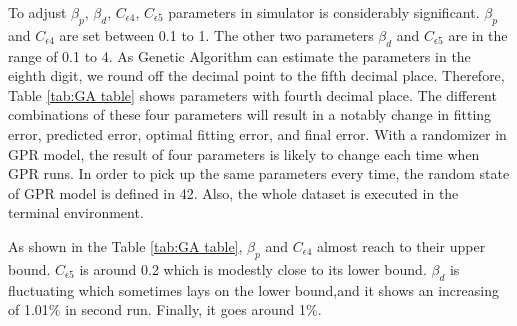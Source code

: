 To adjust $\beta_{p}$, $\beta_{d}$, $C_{\epsilon4}$, $C_{\epsilon5}$ parameters in simulator is considerably significant. $\beta_{p}$ and $C_{\epsilon4}$ are set between 0.1 to 1. The other two parameters $\beta_{d}$ and $C_{\epsilon5}$ are in the range of 0.1 to 4. As Genetic Algorithm can estimate the parameters in the eighth digit, we round off the decimal point to the fifth decimal place. Therefore, Table \ref{tab:GA table}  shows parameters with fourth decimal place. The different combinations of these four parameters will result in a notably change in fitting error, predicted error, optimal fitting error, and final error. With a randomizer in GPR model, the result of four parameters is likely to change each time when GPR runs. In order to pick up the same parameters every time, the random state of GPR model is defined in 42. Also, the whole dataset is executed in the terminal environment. 

As shown in the Table \ref{tab:GA table}, $\beta_{p}$ and $C_{\epsilon4}$ almost reach to their upper bound. $C_{\epsilon5}$ is around 0.2 which is modestly close to its lower bound. $\beta_{d}$ is fluctuating which sometimes lays on the lower bound,and it shows an increasing of 1.01${\%}$ in second run. Finally, it goes around 1${\%}$.   

